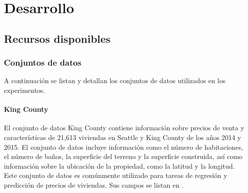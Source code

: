 \chapter{Desarrollo}
\section{Recursos disponibles}
\subsection{Conjuntos de datos}
A continuación se listan y detallan los conjuntos de datos utilizados en los experimentos.

\subsubsection{King County}
El conjunto de datos King County \cite{kaggle_house_2015} contiene información sobre precios de venta y características de 21,613 viviendas en Seattle y King County de los años 2014 y 2015. El conjunto de datos incluye información como el número de habitaciones, el número de baños, la superficie del terreno y la superficie construida, así como información sobre la ubicación de la propiedad, como la latitud y la longitud. Este conjunto de datos es comúnmente utilizado para tareas de regresión y predicción de precios de viviendas. Sus campos se listan en .
 
